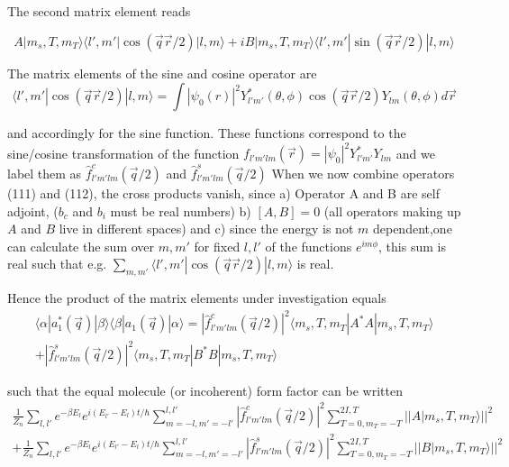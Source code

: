 \documentclass[11pt,a4paper]{article}
\begin{document}
The second matrix element reads

\begin{equation}
 A |m_s, T, m_T \rangle \langle l',m' | \cos (\vec q \vec r /2)|  l,m \rangle
+ i
 B |m_s, T, m_T \rangle \langle l',m' | \sin (\vec q \vec r /2)|  l,m \rangle
\end{equation}



The matrix elements of the sine and cosine operator are
\begin{equation}
\langle l',m' | \cos (\vec q \vec r /2)|  l,m \rangle
=
\int  
|\psi_{0}(r)|^2 Y_{l'm'}^*(\theta, \phi) \cos (\vec q \vec r /2)   Y_{lm}(\theta, \phi) 
d \vec r
\end{equation}

and accordingly for the sine function. These functions correspond to the sine/cosine transformation of the function
$f_{l'm'lm}(\vec r) = |\psi_{0}|^2 Y_{l'm'}^* Y_{lm}$ and we label them as
$\hat f_{l'm'lm}^c (\vec q /2)$ and $\hat f_{l'm'lm}^s (\vec q /2)$ \newline
When we now combine operators (111) and (112), the cross products vanish, since a) Operator A and B are self adjoint,
($b_c$ and $b_i$ must be real numbers) b) $[A,B] = 0$ (all operators making up $A$ and $B$ live in different spaces) and c) 
since the energy is not $m$ dependent,one can calculate the sum over $m, m'$ for fixed $l,l'$ of the functions $e^{im \phi}$,
this sum is real such that e.g. $\sum_{m,m'}\langle l',m' | \cos (\vec q \vec r /2)|  l,m \rangle$ is real.


Hence the product of the matrix elements under investigation equals
\begin{equation}
\begin{split}
\langle \alpha | a_{1}^{*} (\vec q)|\beta \rangle \langle \beta | a_1 (\vec q) |  \alpha \rangle =
|\hat f_{l'm'lm}^c (\vec q /2)|^2 \langle m_s, T, m_T | A^* A |m_s, T, m_T \rangle \\ +
|\hat f_{l'm'lm}^s (\vec q /2)|^2 \langle m_s, T, m_T | B^* B |m_s, T, m_T \rangle 
\end{split}
\end{equation}

such that the equal molecule (or incoherent) form factor can be written
\begin{equation}
\begin{split}
\frac{1}{Z_n} \sum_{l,l'} e^{-\beta E_l} e^{i (E_{l'} - E_{l})  t /\hbar }
\sum_{m = -l,m'=-l'}^{l,l'} |\hat f_{l'm'lm}^c (\vec q /2)|^2
\sum_{T = 0, m_T = -T}^{2I, T} || A |m_s, T, m_T \rangle ||^2 \\ +
\frac{1}{Z_n} \sum_{l,l'} e^{-\beta E_l} e^{i  (E_{l'} - E_{l}) t /\hbar }
\sum_{m = -l,m'=-l'}^{l,l'} |\hat f_{l'm'lm}^s (\vec q /2)|^2
\sum_{T = 0, m_T = -T}^{2I, T} ||B |m_s, T, m_T \rangle ||^ 2
\end{split}
\end{equation}
\end{document}
